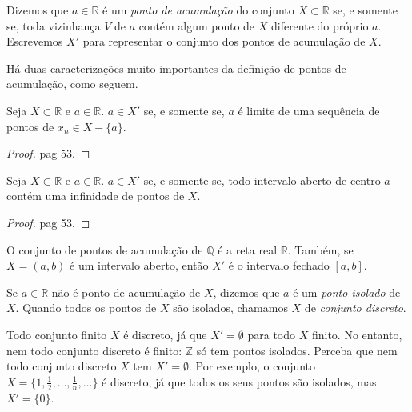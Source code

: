 \begin{definicao}
	Dizemos que $a\in \mathbb{R}$ é um \textit{ponto de acumulação} do conjunto $X\subset \mathbb{R}$ se, e somente se, toda vizinhança $V$ de $a$ contém algum ponto de $X$ diferente do próprio $a$. Escrevemos $X'$ para representar o conjunto dos pontos de acumulação de $X$.
\end{definicao}
Há duas caracterizações muito importantes da definição de pontos de acumulação, como seguem.

\begin{proposicao}
	Seja $X\subset \mathbb{R}$ e $a\in \mathbb{R}$. $a\in X'$ se, e somente se, $a$ é limite de uma sequência de pontos de $x_n\in X-\{a\}$.
	\begin{proof}
		\cite{elonAnalise1} pag 53.
	\end{proof}
\end{proposicao}

\begin{proposicao}
	Seja $X\subset \mathbb{R}$ e $a\in \mathbb{R}$. $a\in X'$ se, e somente se, todo intervalo aberto de centro $a$ contém uma infinidade de pontos de $X$.
	\begin{proof}
		\cite{elonAnalise1} pag 53.
	\end{proof}
\end{proposicao}

\begin{exemplo}
	O conjunto de pontos de acumulação de $\mathbb{Q}$ é a reta real $\mathbb{R}$. Também, se $X = (a,b)$ é um intervalo aberto, então $X'$ é o intervalo fechado $[a,b]$.
\end{exemplo}

\begin{definicao}
	Se $a\in \mathbb{R}$ não é ponto de acumulação de $X$, dizemos que $a$ é um \textit{ponto isolado} de $X$. Quando todos os pontos de $X$ são isolados, chamamos $X$ de \textit{conjunto discreto}.
\end{definicao}

\begin{exemplo}
	Todo conjunto finito $X$ é discreto, já que $X' = \emptyset$ para todo $X$ finito. No entanto, nem todo conjunto discreto é finito: $\mathbb{Z}$ só tem pontos isolados.  Perceba que nem todo conjunto discreto $X$ tem $X' = \emptyset$. Por exemplo, o conjunto $X = \{1, \frac 1 2, \dots, \frac 1 n, \dots \}$ é discreto, já que todos os seus pontos são isolados, mas $X'= \{0\}$.
\end{exemplo}

